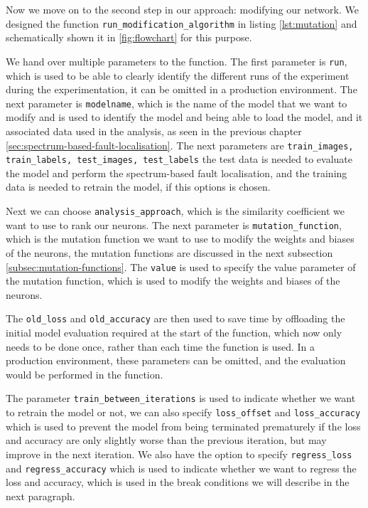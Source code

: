 Now we move on to the second step in our approach: modifying our network.
We designed the function \texttt{run\_modification\_algorithm} in listing \ref{lst:mutation} and schematically shown it in \ref{fig:flowchart} for this purpose.

We hand over multiple parameters to the function.
The first parameter is \texttt{run}, which is used to be able to clearly identify the different runs of the experiment during the experimentation, it can be omitted in a production environment.
The next parameter is \texttt{modelname}, which is the name of the model that we want to modify and is used to identify the model and being able to load the model, and it associated data used in the analysis, as seen in the previous chapter \ref{sec:spectrum-based-fault-localisation}.
The next parameters are \texttt{train\_images, train\_labels, test\_images, test\_labels} the test data is needed to evaluate the model and perform the spectrum-based fault localisation, and the training data is needed to retrain the model, if this options is chosen.

Next we can choose \texttt{analysis\_approach}, which is the similarity coefficient we want to use to rank our neurons.
The next parameter is \texttt{mutation\_function}, which is the mutation function we want to use to modify the weights and biases of the neurons, the mutation functions are discussed in the next subsection \ref{subsec:mutation-functions}.
The \texttt{value} is used to specify the value parameter of the mutation function, which is used to modify the weights and biases of the neurons.

The \texttt{old\_loss} and \texttt{old\_accuracy} are then used to save time by offloading the initial model evaluation required at the start of the function, which now only needs to be done once, rather than each time the function is used.
In a production environment, these parameters can be omitted, and the evaluation would be performed in the function.

The parameter \texttt{train\_between\_iterations} is used to indicate whether we want to retrain the model or not, we can also specify \texttt{loss\_offset} and \texttt{loss\_accuracy} which is used to prevent the model from being terminated prematurely if the loss and accuracy are only slightly worse than the previous iteration, but may improve in the next iteration.
We also have the option to specify \texttt{regress\_loss} and \texttt{regress\_accuracy} which is used to indicate whether we want to regress the loss and accuracy, which is used in the break conditions we will describe in the next paragraph.

